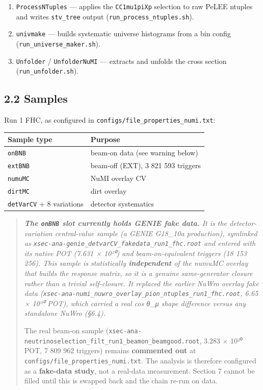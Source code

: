 \documentclass[11pt]{article}
\begin{document}
\begin{enumerate}
\item \texttt{ProcessNTuples} — applies the \texttt{CC1mu1piXp} selection to raw PeLEE ntuples and writes \texttt{stv\_tree} output (\texttt{run\_process\_ntuples.sh}).
\item \texttt{univmake} — builds systematic universe histograms from a bin config (\texttt{run\_universe\_maker.sh}).
\item \texttt{Unfolder} / \texttt{UnfolderNuMI} — extracts and unfolds the cross section (\texttt{run\_unfolder.sh}).
\end{enumerate}

\subsection*{2.2 Samples}

Run 1 FHC, as configured in \texttt{configs/file\_properties\_numi.txt}:

\begin{tabularx}{\textwidth}{|>{\raggedright\arraybackslash}X|>{\raggedright\arraybackslash}X|}
\hline
\textbf{Sample type} & \textbf{Purpose} \\
\hline
\texttt{onBNB} & beam-on data (see warning below) \\
\texttt{extBNB} & beam-off (EXT), 3 821 593 triggers \\
\texttt{numuMC} & NuMI overlay CV \\
\texttt{dirtMC} & dirt overlay \\
\texttt{detVarCV} + 8 variations & detector systematics \\
\hline
\end{tabularx}

\begin{quote}\itshape
\textbf{The \texttt{onBNB} slot currently holds GENIE fake data.} It is the detector-variation central-value sample (a GENIE G18\_10a production), symlinked as \texttt{xsec-ana-genie\_detvarCV\_fakedata\_run1\_fhc.root} and entered with its native POT (7.631 × 10²⁰) and beam-on-equivalent triggers (18 153 256). This sample is statistically \textbf{independent} of the numuMC overlay that builds the response matrix, so it is a genuine same-generator closure rather than a trivial self-closure. It replaced the earlier NuWro overlay fake data (\texttt{xsec-ana-numi\_nuwro\_overlay\_pion\_ntuples\_run1\_fhc.root}, 6.65 × 10²⁰ POT), which carried a real cos θ\_μ \emph{shape} difference versus any standalone NuWro (§6.4).

The real beam-on sample (\texttt{xsec-ana-neutrinoselection\_filt\_run1\_beamon\_beamgood.root}, 3.283 × 10²⁰ POT, 7 809 962 triggers) remains \textbf{commented out} at \texttt{configs/file\_properties\_numi.txt}. The analysis is therefore configured as a \textbf{fake-data study}, not a real-data measurement. Section 7 cannot be filled until this is swapped back and the chain re-run on data.
\end{quote}
\end{document}
